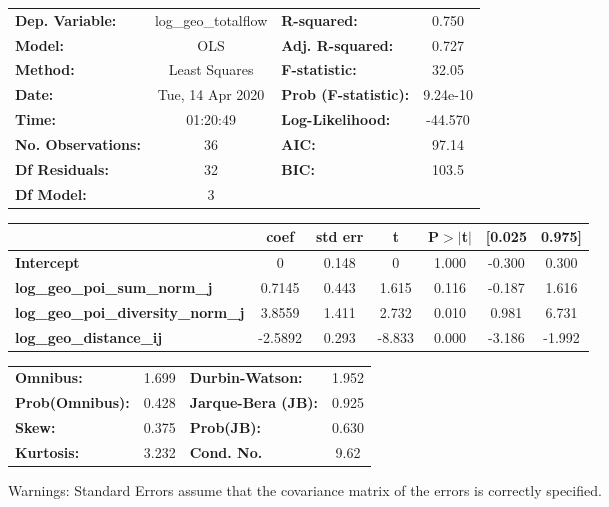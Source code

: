 \begin{center}
\begin{tabular}{lclc}
\toprule
\textbf{Dep. Variable:}                    & log\_geo\_totalflow & \textbf{  R-squared:         } &     0.750   \\
\textbf{Model:}                            &         OLS         & \textbf{  Adj. R-squared:    } &     0.727   \\
\textbf{Method:}                           &    Least Squares    & \textbf{  F-statistic:       } &     32.05   \\
\textbf{Date:}                             &   Tue, 14 Apr 2020  & \textbf{  Prob (F-statistic):} &  9.24e-10   \\
\textbf{Time:}                             &       01:20:49      & \textbf{  Log-Likelihood:    } &   -44.570   \\
\textbf{No. Observations:}                 &            36       & \textbf{  AIC:               } &     97.14   \\
\textbf{Df Residuals:}                     &            32       & \textbf{  BIC:               } &     103.5   \\
\textbf{Df Model:}                         &             3       & \textbf{                     } &             \\
\bottomrule
\end{tabular}
\begin{tabular}{lcccccc}
                                           & \textbf{coef} & \textbf{std err} & \textbf{t} & \textbf{P$> |$t$|$} & \textbf{[0.025} & \textbf{0.975]}  \\
\midrule
\textbf{Intercept}                         &            0  &        0.148     &         0  &         1.000        &       -0.300    &        0.300     \\
\textbf{log\_geo\_poi\_sum\_norm\_j}       &       0.7145  &        0.443     &     1.615  &         0.116        &       -0.187    &        1.616     \\
\textbf{log\_geo\_poi\_diversity\_norm\_j} &       3.8559  &        1.411     &     2.732  &         0.010        &        0.981    &        6.731     \\
\textbf{log\_geo\_distance\_ij}            &      -2.5892  &        0.293     &    -8.833  &         0.000        &       -3.186    &       -1.992     \\
\bottomrule
\end{tabular}
\begin{tabular}{lclc}
\textbf{Omnibus:}       &  1.699 & \textbf{  Durbin-Watson:     } &    1.952  \\
\textbf{Prob(Omnibus):} &  0.428 & \textbf{  Jarque-Bera (JB):  } &    0.925  \\
\textbf{Skew:}          &  0.375 & \textbf{  Prob(JB):          } &    0.630  \\
\textbf{Kurtosis:}      &  3.232 & \textbf{  Cond. No.          } &     9.62  \\
\bottomrule
\end{tabular}
\end{center}

Warnings: \newline
 [1] Standard Errors assume that the covariance matrix of the errors is correctly specified.